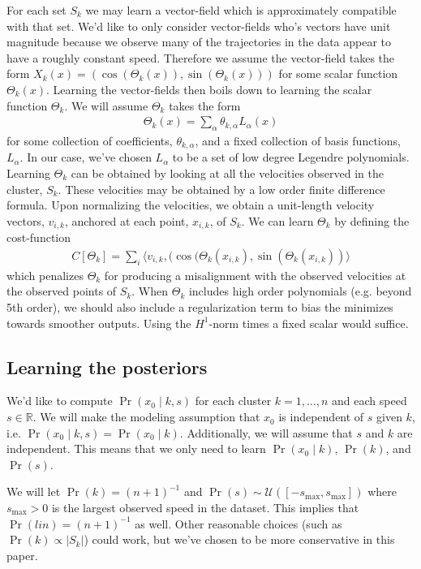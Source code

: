 \documentclass[conference]{IEEEtran}
\begin{document}
  For each set $S_k$ we may learn a vector-field which is approximately compatible with that set.
  We'd like to only consider vector-fields who's vectors have unit magnitude because we observe many of the trajectories in the data appear to have a roughly constant speed.
  Therefore we assume the vector-field takes the form $X_k(x) = \left( \cos( \Theta_k(x) ) , \sin(\Theta_k(x)) \right)$ for some scalar function $\Theta_k(x)$.
  Learning the vector-fields then boils down to learning the scalar function $\Theta_k$.
  We will assume $\Theta_k$ takes the form
  \begin{align*}
  	\Theta_k(x) = \sum_{\alpha} \theta_{k,\alpha} L_{\alpha}(x)
  \end{align*}
  for some collection of coefficients, $\theta_{k,\alpha}$, and a fixed collection of basis functions, $L_{\alpha}$.
  In our case, we've chosen $L_{\alpha}$ to be a set of low degree Legendre polynomials.
  Learning $\Theta_k$ can be obtained by looking at all the velocities observed in the cluster, $S_k$.
  These velocities may be obtained by a low order finite difference formula.
  Upon normalizing the velocities, we obtain a unit-length velocity vectors, $v_{i,k}$, anchored at each point, $x_{i,k}$, of $S_k$.
  We can learn $\Theta_k$ by defining the cost-function
  \begin{align*}
  	C[ \Theta_k] = \sum_i \langle v_{i,k} , ( \cos(\Theta_k( x_{i,k}) , \sin( \Theta_k( x_{i,k} ) ) \rangle
  \end{align*}
  which penalizes $\Theta_k$ for producing a misalignment with the observed velocities at the observed points of $S_k$.
  When $\Theta_{k}$ includes high order polynomials (e.g. beyond 5th order), we should also include a regularization term to bias the minimizes towards smoother outputs.
  Using the $H^1$-norm times a fixed scalar would suffice.
  
  
  \subsection{Learning the posteriors}
  We'd like to compute $\Pr( x_0 \mid k,s)$ for each cluster $k=1,\dots,n$ and each speed $s \in \mathbb{R}$.
  We will make the modeling assumption that $x_0$ is independent of $s$ given $k$, i.e. $\Pr( x_0 \mid k,s) = \Pr(x_0 \mid k)$.
  Additionally, we will assume that $s$ and $k$ are independent.
  This means that we only need to learn $\Pr( x_0 \mid k)$, $\Pr(k)$, and $\Pr(s)$.
  
  We will let $\Pr(k) = (n+1)^{-1}$ and $\Pr(s) \sim \mathcal{U}( [-s_{\max}, s_{\max} ] )$
  where $s_{\max}>0$ is the largest observed speed in the dataset.  This implies that $\Pr(lin) = (n+1)^{-1}$ as well.
  Other reasonable choices (such as $\Pr(k) \propto | S_k|$) could work, but we've chosen to be more conservative in this paper.
  
\end{document}
